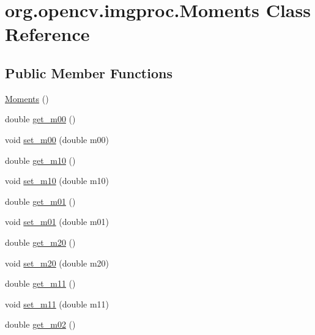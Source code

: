 \hypertarget{classorg_1_1opencv_1_1imgproc_1_1_moments}{}\section{org.\+opencv.\+imgproc.\+Moments Class Reference}
\label{classorg_1_1opencv_1_1imgproc_1_1_moments}
\subsection*{Public Member Functions}
\begin{DoxyCompactItemize}
\item 
\mbox{\hyperlink{classorg_1_1opencv_1_1imgproc_1_1_moments_aae99914917bed3a24aea006512e5bdc2}{Moments}} ()
\item 
double \mbox{\hyperlink{classorg_1_1opencv_1_1imgproc_1_1_moments_a76d9293c816dd791bbc1523fa5aff280}{get\+\_\+m00}} ()
\item 
void \mbox{\hyperlink{classorg_1_1opencv_1_1imgproc_1_1_moments_a2a895033d2d7c23bf02a4f2a4126e2d3}{set\+\_\+m00}} (double m00)
\item 
double \mbox{\hyperlink{classorg_1_1opencv_1_1imgproc_1_1_moments_a2321f1ee96116b5adc024b568bc74f57}{get\+\_\+m10}} ()
\item 
void \mbox{\hyperlink{classorg_1_1opencv_1_1imgproc_1_1_moments_a86a9d6c60f68e5c9262faa3efbe6711c}{set\+\_\+m10}} (double m10)
\item 
double \mbox{\hyperlink{classorg_1_1opencv_1_1imgproc_1_1_moments_af7b379a12fd2848cc2eab581c04599ae}{get\+\_\+m01}} ()
\item 
void \mbox{\hyperlink{classorg_1_1opencv_1_1imgproc_1_1_moments_a976a7b272f6576a457b4e84b23962a11}{set\+\_\+m01}} (double m01)
\item 
double \mbox{\hyperlink{classorg_1_1opencv_1_1imgproc_1_1_moments_abde344fdca7db6513ab8c203f994e229}{get\+\_\+m20}} ()
\item 
void \mbox{\hyperlink{classorg_1_1opencv_1_1imgproc_1_1_moments_ac4003b51f6ae1a2523452bc74d2f9348}{set\+\_\+m20}} (double m20)
\item 
double \mbox{\hyperlink{classorg_1_1opencv_1_1imgproc_1_1_moments_acd747b8bdcf050bd0b0dca70f3c783ce}{get\+\_\+m11}} ()
\item 
void \mbox{\hyperlink{classorg_1_1opencv_1_1imgproc_1_1_moments_aeb8175981f820a8dde13c1ba5828e5d7}{set\+\_\+m11}} (double m11)
\item 
double \mbox{\hyperlink{classorg_1_1opencv_1_1imgproc_1_1_moments_a99134edcc9cfec292baa4b483fc7dba3}{get\+\_\+m02}} ()

\end{DoxyCompactItemize}
